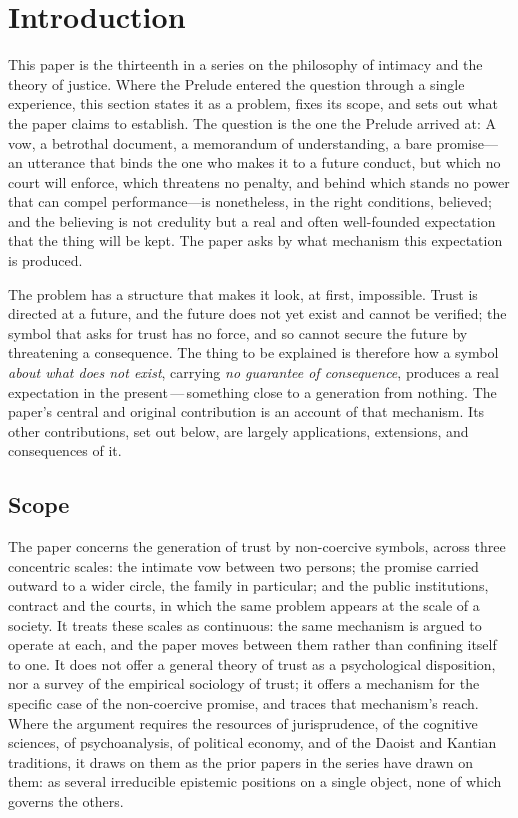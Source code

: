 \section{Introduction}
\label{p13:sec:intro}

\noindent
This paper is the thirteenth in a series on the philosophy of intimacy and the theory of justice. Where the Prelude entered the question through a single experience, this section states it as a problem, fixes its scope, and sets out what the paper claims to establish. The question is the one the Prelude arrived at:  A vow, a betrothal document, a memorandum of understanding, a bare promise---an utterance that binds the one who makes it to a future conduct, but which no court will enforce, which threatens no penalty, and behind which stands no power that can compel performance---is nonetheless, in the right conditions, believed; and the believing is not credulity but a real and often well-founded expectation that the thing will be kept. The paper asks by what mechanism this expectation is produced.

The problem has a structure that makes it look, at first, impossible. Trust is directed at a future, and the future does not yet exist and cannot be verified; the symbol that asks for trust has no force, and so cannot secure the future by threatening a consequence. The thing to be explained is therefore how a symbol \emph{about what does not exist}, carrying \emph{no guarantee of consequence}, produces a real expectation in the present\,---\,something close to a generation from nothing. The paper's central and original contribution is an account of that mechanism. Its other contributions, set out below, are largely applications, extensions, and consequences of it.

\subsection*{Scope}

The paper concerns the generation of trust by non-coercive symbols, across three concentric scales: the intimate vow between two persons; the promise carried outward to a wider circle, the family in particular; and the public institutions, contract and the courts, in which the same problem appears at the scale of a society. It treats these scales as continuous: the same mechanism is argued to operate at each, and the paper moves between them rather than confining itself to one. It does not offer a general theory of trust as a psychological disposition, nor a survey of the empirical sociology of trust; it offers a mechanism for the specific case of the non-coercive promise, and traces that mechanism's reach. Where the argument requires the resources of jurisprudence, of the cognitive sciences, of psychoanalysis, of political economy, and of the Daoist and Kantian traditions, it draws on them as the prior papers in the series have drawn on them: as several irreducible epistemic positions on a single object, none of which governs the others.

